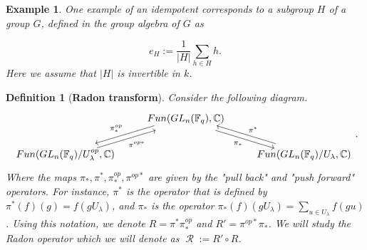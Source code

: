 \documentclass[10pt,a4paper]{amsart}
\newtheorem{ex}{Example}
\newtheorem{defn}{Definition}
\def\IM#1{\textcolor[rgb]{0.00,0.00,0.75}{[I: #1]}}
\DeclareMathOperator{\R}{\mathcal{R}}
\begin{document}
\begin{ex}\label{subgroup-projector}
    One example of an idempotent corresponds to a subgroup $H$ of a group $G$, defined in the group algebra of $G$ as
    
    \begin{equation*}
        e_H:= \frac{1}{|H|}\sum_{h\in H}h.
    \end{equation*}
    Here we assume that $|H|$ is invertible in $k$.
\end{ex}

\begin{defn}[{\bf Radon transform}]\label{Radon_transform}
    Consider the following diagram. %
    \begin{equation*}
        \begin{tikzcd}
            & {Fun(GL_n(\mathbb{F}_q),\mathbb{C})} \arrow[rd, "\pi_*"', shift right] \arrow[ld, "\pi^{op}_*"', shift right] & \\
            {Fun(GL_n(\mathbb{F}_q)/U_{\lambda}^{op},\mathbb{C})} \arrow[ru, "\pi^{op *}"', shift right] &                                                                                                               & {Fun(GL_n(\mathbb{F}_q)/U_{\lambda},\mathbb{C})} \arrow[lu, "\pi^*"', shift right]
        \end{tikzcd}
.
    \end{equation*}
    Where the maps $\pi_*,\pi^*,\pi_*^{op},\pi^{op*}$ are given by the "pull back" and "push forward" operators. For instance, $\pi^*$ is the operator that is defined by $\pi^*(f)(g) = f(gU_\lambda)$, and $\pi_*$ is the operator $\pi_*(f)(gU_\lambda) = \sum_{u \in U_\lambda} f(gu)$. Using this notation, we denote $R = \pi^{*} \pi^{op}_*$ and $R' = \pi^{op*} \pi_*$. We will study the Radon operator which we will denote as $\R:=R' \circ R$.
\end{defn}
\end{document}
